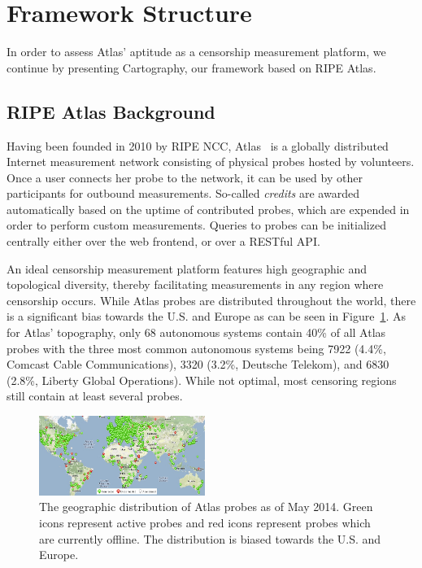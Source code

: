 \section{Framework Structure}
\label{sec:framework}
In order to assess Atlas' aptitude as a censorship measurement platform, we continue by presenting \textsf{Cartography}, our framework based on RIPE Atlas.

\subsection{RIPE Atlas Background}
Having been founded in 2010 by RIPE NCC, Atlas~\cite{atlas} is a globally
distributed Internet measurement network consisting of physical probes hosted by
volunteers.  Once a user connects her probe to the network, it can be used by other participants for outbound measurements. So-called \emph{credits} are awarded
automatically based on the uptime of contributed probes, which are expended in order to perform custom measurements. Queries to probes can be initialized centrally either over the web frontend, or over a RESTful API.

An ideal censorship measurement platform features high geographic and
topological diversity, thereby facilitating measurements in any region where
censorship occurs.  While Atlas probes are distributed throughout the world,
there is a significant bias towards the U.S. and Europe as can be seen in
Figure~\ref{fig:probe_distribution}.  As for Atlas' topography, only 68
autonomous systems contain 40\% of all Atlas probes with the three most common
autonomous systems being 7922 (4.4\%, Comcast Cable Communications), 3320
(3.2\%, Deutsche Telekom), and 6830 (2.8\%, Liberty Global Operations).  While
not optimal, most censoring regions still contain at least several probes.

\begin{figure}[t]
\centering
\includegraphics[width=0.48\textwidth]{diagrams/probe_distribution.jpg}
\caption{The geographic distribution of Atlas probes as of May 2014.  Green
icons represent active probes and red icons represent probes which are
currently offline.  The distribution is biased towards the U.S. and Europe.}
\label{fig:probe_distribution}
\end{figure}

